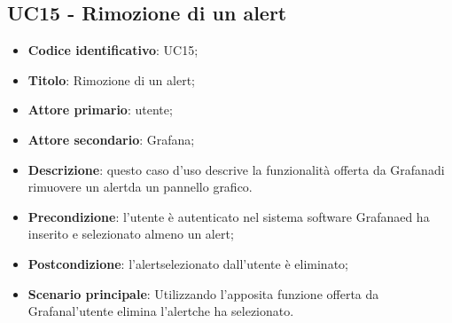 \subsection{UC15 - Rimozione di un alert}
\begin{itemize}
	\item \textbf{Codice identificativo}: UC15;
	\item \textbf{Titolo}: Rimozione di un alert\glo;
	\item \textbf{Attore primario}: utente;
	\item \textbf{Attore secondario}: Grafana\glo;
	\item \textbf{Descrizione}: questo caso d'uso descrive la funzionalità offerta da Grafana\glosp di rimuovere un alert\glosp da un pannello grafico.
	\item \textbf{Precondizione}: l'utente è autenticato nel sistema software Grafana\glosp ed ha inserito e selezionato almeno un alert\glo;
	\item \textbf{Postcondizione}: l'alert\glosp selezionato dall'utente è eliminato;
	\item \textbf{Scenario principale}: Utilizzando l'apposita funzione offerta da Grafana\glosp l'utente elimina l'alert\glosp che ha selezionato.
\end{itemize} 
